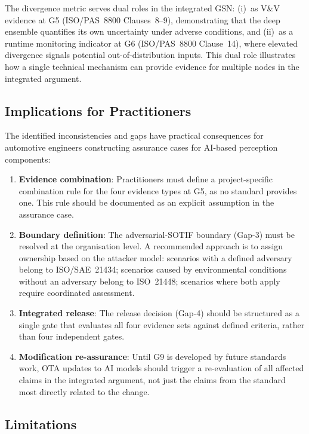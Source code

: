 The divergence metric serves dual roles in the integrated GSN:
(i)~as V\&V evidence at G5 (ISO/PAS~8800 Clauses~8--9), demonstrating
that the deep ensemble quantifies its own uncertainty under adverse
conditions, and (ii)~as a runtime monitoring indicator at G6
(ISO/PAS~8800 Clause~14), where elevated divergence signals potential
out-of-distribution inputs. This dual role illustrates how a single
technical mechanism can provide evidence for multiple nodes in the
integrated argument.

\subsection{Implications for Practitioners}

The identified inconsistencies and gaps have practical consequences for
automotive engineers constructing assurance cases for AI-based perception
components:

\begin{enumerate}
    \item \textbf{Evidence combination}: Practitioners must define a
          project-specific combination rule for the four evidence types
          at G5, as no standard provides one. This rule should be
          documented as an explicit assumption in the assurance case.
    \item \textbf{Boundary definition}: The adversarial-SOTIF boundary
          (Gap-3) must be resolved at the organisation level. A
          recommended approach is to assign ownership based on the
          attacker model: scenarios with a defined adversary belong to
          ISO/SAE~21434; scenarios caused by environmental conditions
          without an adversary belong to ISO~21448; scenarios where both
          apply require coordinated assessment.
    \item \textbf{Integrated release}: The release decision (Gap-4) should
          be structured as a single gate that evaluates all four evidence
          sets against defined criteria, rather than four independent gates.
    \item \textbf{Modification re-assurance}: Until G9 is developed by
          future standards work, OTA updates to AI models should trigger
          a re-evaluation of all affected claims in the integrated
          argument, not just the claims from the standard most directly
          related to the change.
\end{enumerate}

\subsection{Limitations}

